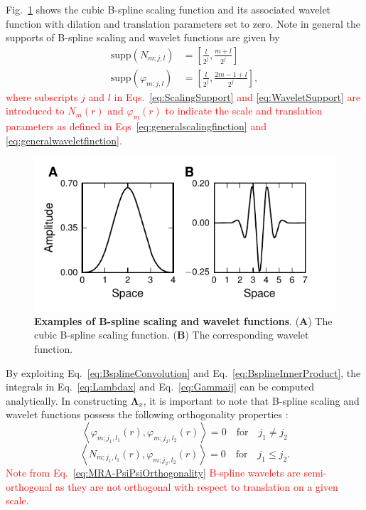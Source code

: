 \documentclass[review,authoryear,3p]{elsarticle}
\newcommand{\parham}[1]{\textcolor{red}{#1}}
\begin{document}
Fig.~\ref{fig:MRA-Figure1} shows the cubic B-spline scaling function and its associated wavelet function with dilation and translation parameters set to zero. Note in general the supports of B-spline scaling and wavelet functions are given by 
\begin{align}
	\mathrm{supp}(N_{m;j,l})&=\left[\frac{l}{2^j},\frac{m+l}{2^j}\right] \label{eq:ScalingSupport}\\  
  \mathrm{supp}(\varphi_{m;j,l})&=\left[\frac{l}{2^j},\frac{2m-1+l}{2^j}\right],\label{eq:WaveletSupport}
	\end{align}    
\parham{where subscripts $j$ and $l$ in Eqs.~\eqref{eq:ScalingSupport} and \eqref{eq:WaveletSupport} are introduced to $N_{m}(r)$ and $\varphi_{m}(r)$ to indicate the scale and translation parameters as defined in Eqs~\eqref{eq:generalscalingfinction} and \eqref{eq:generalwaveletfinction}.}
\begin{figure}[!t]
\centering
\includegraphics{./Graph/fig4.pdf}
\caption{{\bf Examples of B-spline scaling and wavelet functions}. (\textbf{A}) The cubic B-spline scaling function. (\textbf{B}) The corresponding wavelet function.}
\label{fig:MRA-Figure1}
\end{figure}
 
By exploiting Eq.~\eqref{eq:BsplineConvolution} and Eq.~\eqref{eq:BsplineInnerProduct}, the integrals in Eq.~\eqref{eq:Lambdax} and Eq.~\eqref{eq:Gammaij} can be computed analytically. In constructing $\boldsymbol\Lambda_{x}$, it is important to note that B-spline scaling and wavelet functions possess the following orthogonality properties \citep{Unser1993}: 
\begin{equation}
  \left\langle \varphi_{m;j_1,l_1}(r),\varphi_{m;j_2,l_2}(r)\right\rangle =0  \quad \mathrm{for} \quad j_1\neq j_2
 \label{eq:MRA-PsiPsiOrthogonality} 
 \end{equation}
 \begin{equation}
  \left\langle N_{m;j_1,l_1}(r),\varphi_{m;j_2,l_2}(r)\right\rangle =0  \quad \mathrm{for} \quad j_1\leq j_2.
 \label{eq:MRA-PhiPsiOrthogonality}
 \end{equation}
  \parham{Note from Eq.~\eqref{eq:MRA-PsiPsiOrthogonality} B-spline wavelets are semi-orthogonal as they are not orthogonal with respect to translation on a given scale.} 
\end{document}
